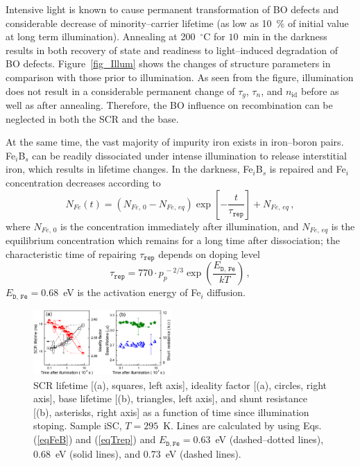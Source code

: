 \documentclass[aip,jap, amsmath,amssymb,reprint]{revtex4-1}
\begin{document}
Intensive light is known\cite{LIDRev,LIDRev2} to cause permanent transformation of BO defects and considerable decrease of minority--carrier lifetime (as low as 10~\% of initial value at long term illumination).
Annealing at 200~$^\circ$C for $10$~min in the darkness results in both recovery of state and readiness to light--induced degradation of BO defects.
Figure~\ref{fig_Illum} shows the changes of structure parameters in comparison with those prior to illumination.
As seen from the figure, illumination does not result in a considerable permanent change of $\tau_g$, $\tau_n$, and $n_{\mathrm{id}}$ before as well as after annealing.
Therefore, the BO influence on recombination can be neglected  in both the SCR and the base.

At the same time, the vast majority of impurity iron exists in iron--boron pairs.
Fe$_i$B$_s$ can be readily dissociated under intense illumination to release interstitial iron,
which results in lifetime changes.
In the darkness, Fe$_i$B$_s$ is repaired and Fe$_i$ concentration decreases according to \cite{MurphyJAP2011,Wijaranakula}
\begin{equation}
\label{eqFeB}
N_{Fe}(t)=(N_{Fe,\,0}-N_{Fe,\,eq})\exp\left[-\frac{t}{\tau_{\mathtt{rep}}}\right]+N_{Fe,\,eq}\,,
\end{equation}
where
$N_{Fe,\,0}$ is the concentration immediately after illumination, and $N_{Fe,\,eq}$ is the equilibrium concentration which remains for a long time after dissociation;
the characteristic time of repairing $\tau_{\mathtt{rep}}$ depends on doping level
\begin{equation}
\label{eqTrep}
\tau_{\mathtt{rep}}=770\cdot p_p^{\,-2/3}\exp\left(\frac{E_{\mathtt{D,\,Fe}}}{kT}\right)\,,
\end{equation}
$E_{\mathtt{D,\,Fe}}=0.68$~eV is the activation energy of Fe$_i$ diffusion.

\begin{figure}
\includegraphics[width=0.47\textwidth]{fig_11ab}%
\caption{\label{fig_Time}
SCR lifetime [(a), squares, left axis], ideality factor [(a), circles, right axis], base  lifetime [(b), triangles, left axis], and shunt resistance [(b), asterisks, right axis] as a function of time since illumination stoping.
Sample iSC, $T=295$~K.
Lines are calculated by using Eqs.(\ref{eqFeB}) and (\ref{eqTrep}) and $E_{\mathtt{D,Fe}}=0.63$~eV (dashed--dotted lines), 0.68~eV (solid lines), and 0.73~eV (dashed lines).
}%
\end{figure}
\end{document}
